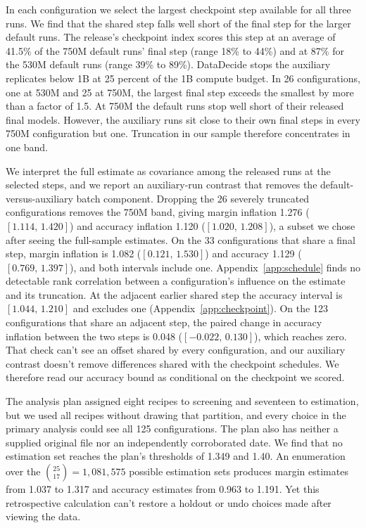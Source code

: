 \documentclass{article}
\newcommand{\ci}[2]{\ensuremath{[#1,\,#2]}}
\begin{document}
In each configuration we select the largest checkpoint step available for all three runs. We find that the shared step falls well short of the final step for the larger default runs. The release's checkpoint index scores this step at an average of 41.5\% of the 750M default runs' final step (range 18\% to 44\%) and at 87\% for the 530M default runs (range 39\% to 89\%). DataDecide stops the auxiliary replicates below 1B at 25 percent of the 1B compute budget. In 26 configurations, one at 530M and 25 at 750M, the largest final step exceeds the smallest by more than a factor of 1.5. At 750M the default runs stop well short of their released final models. However, the auxiliary runs sit close to their own final steps in every 750M configuration but one. Truncation in our sample therefore concentrates in one band.

We interpret the full estimate as covariance among the released runs at the selected steps, and we report an auxiliary-run contrast that removes the default-versus-auxiliary batch component. Dropping the 26 severely truncated configurations removes the 750M band, giving margin inflation 1.276 (\ci{1.114}{1.420}) and accuracy inflation 1.120 (\ci{1.020}{1.208}), a subset we chose after seeing the full-sample estimates. On the 33 configurations that share a final step, margin inflation is 1.082 (\ci{0.121}{1.530}) and accuracy 1.129 (\ci{0.769}{1.397}), and both intervals include one. Appendix~\ref{app:schedule} finds no detectable rank correlation between a configuration's influence on the estimate and its truncation. At the adjacent earlier shared step the accuracy interval is \ci{1.044}{1.210} and excludes one (Appendix~\ref{app:checkpoint}). On the 123 configurations that share an adjacent step, the paired change in accuracy inflation between the two steps is 0.048 (\ci{-0.022}{0.130}), which reaches zero. That check can't see an offset shared by every configuration, and our auxiliary contrast doesn't remove differences shared with the checkpoint schedules. We therefore read our accuracy bound as conditional on the checkpoint we scored.

The analysis plan assigned eight recipes to screening and seventeen to estimation, but we used all recipes without drawing that partition, and every choice in the primary analysis could see all 125 configurations. The plan also has neither a supplied original file nor an independently corroborated date. We find that no estimation set reaches the plan's thresholds of 1.349 and 1.40. An enumeration over the $\binom{25}{17}=1{,}081{,}575$ possible estimation sets produces margin estimates from 1.037 to 1.317 and accuracy estimates from 0.963 to 1.191. Yet this retrospective calculation can't restore a holdout or undo choices made after viewing the data.
\end{document}
